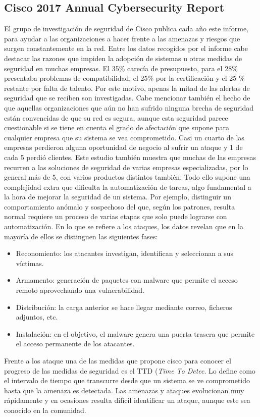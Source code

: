\subsection{Cisco 2017 Annual Cybersecurity Report}
El grupo de investigación de seguridad de Cisco publica cada año este informe, para ayudar a las organizaciones a hacer frente a las amenazas y riesgos que surgen constantemente en la red. Entre los datos recogidos por el informe cabe destacar las razones que impiden la adopción de sistemas u otras medidas de seguridad en muchas empresas. El 35\% carecía de presupuesto, para el 28\% presentaba problemas de compatibilidad, el 25\% por la certificación y el 25 \% restante por falta de talento. Por este motivo, apenas la mitad de las alertas de seguridad que se reciben son investigadas. Cabe mencionar también el hecho de que aquellas organizaciones que aún no han sufrido ninguna brecha de seguridad están convencidas de que su red es segura, aunque esta seguridad parece cuestionable si se tiene en cuenta el grado de afectación que supone para cualquier empresa que su sistema se vea comprometido. Casi un cuarto de las empresas perdieron alguna oportunidad de negocio al sufrir un ataque y 1 de cada 5 perdió clientes. Este estudio también muestra que muchas de las empresas recurren a las soluciones de seguridad de varias empresas especializadas, por lo general más de 5, con varios productos distintos también. Todo ello supone una complejidad extra que dificulta la automatización de tareas, algo fundamental a la hora de mejorar la seguridad de un sistema. Por ejemplo, distinguir un comportamiento anómalo y sospechoso del que, según los patrones, resulta normal requiere un proceso de varias etapas que solo puede lograrse con automatización.
En lo que se refiere a los ataques, los datos revelan que en la mayoría de ellos se distinguen las siguientes fases:
\begin{itemize}
	\item Reconomiento: los atacantes investigan, identifican y seleccionan a sus víctimas.
	\item Armamento: generación de paquetes con malware que permite el acceso remoto aprovechando una vulnerabilidad.
	\item Distribución: la carga anterior se hace llegar mediante correo, ficheros adjuntos, etc.
	\item Instalación: en el objetivo, el malware genera una puerta trasera que permite el acceso permanente de los atacantes.
\end{itemize}
Frente a los ataque una de las medidas que propone cisco para conocer el progreso de las medidas de seguridad es el TTD (\textit{Time To Detec}. Lo define como el intervalo de tiempo que transcurre desde que un sistema se ve comprometido hasta que la amenaza es detectada. Las amenazas y ataques evolucionan muy rápidamente y en ocasiones resulta difícil identificar un ataque, aunque este sea conocido en la comunidad. 


